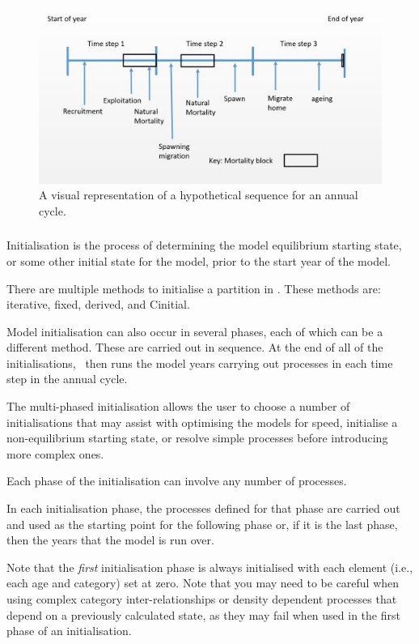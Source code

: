 \begin{figure}[H]
	\centering
	\includegraphics[scale=0.5]{Figures/annual_cycle.jpg}
	\caption{A visual representation of a hypothetical sequence for an annual cycle.}\label{Fig:annual}
\end{figure}

\subsubsection{}

Initialisation is the process of determining the model equilibrium starting state, or some other initial state for the model, prior to the start year of the model.

There are multiple methods to initialise a partition in \CNAME. These methods are: iterative, fixed, derived, and Cinitial. 

Model initialisation can also occur in several phases, each of which can be a different method. These are carried out in sequence. At the end of all of the initialisations, \CNAME\ then runs the model years carrying out processes in each time step in the annual cycle.

The multi-phased initialisation allows the user to choose a number of initialisations that may assist with optimising the models for speed, initialise a non-equilibrium starting state, or resolve simple processes before introducing more complex ones.

Each phase of the initialisation can involve any number of processes.

In each initialisation phase, the processes defined for that phase are carried out and used as the starting point for the following phase or, if it is the last phase, then the years that the model is run over. 

Note that the \emph{first} initialisation phase is always initialised with each element (i.e., each age and category) set at zero. Note that you may need to be careful when using complex category inter-relationships or density dependent processes that depend on a previously calculated state, as they may fail when used in the first phase of an initialisation. 

